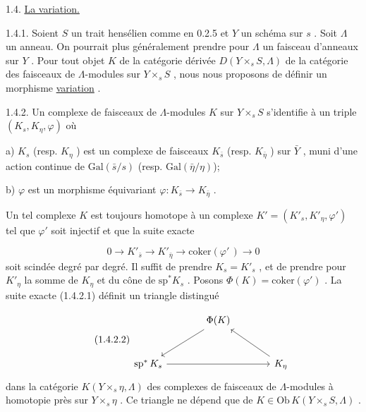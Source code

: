 1.4. \underline{La variation.}

1.4.1. Soient $S$ un trait hensélien comme en 0.2.5 et $Y$ un schéma sur $s$ . Soit $\Lambda$ un anneau. On pourrait plus généralement prendre pour $\Lambda$ un faisceau d'anneaux sur $Y$ . Pour tout objet $K$ de la catégorie dérivée $D(Y \times_s S, \Lambda)$ de la catégorie des faisceaux de $\Lambda$-modules sur $Y \times_s S$ , nous nous proposons de définir un morphisme \underline{variation} .

1.4.2. Un complexe de faisceaux de $\Lambda$-modules $K$ sur $Y \times_s S$ s'identifie à un triple $(K_s, K_\eta , \varphi)$ où

a) $K_s$ (resp. $K_\eta$ ) est un complexe de faisceaux $K_{\bar{s}}$ (resp. $K_{\bar{\eta}}$ ) sur $\bar{Y}$ , muni d'une action continue de $\mathrm{Gal}(\bar{s}/s)$ (resp. $\mathrm{Gal}(\bar{\eta}/\eta)$);

b) $\varphi$ est un morphisme équivariant $\varphi\colon K_{\bar{s}} \to K_{\bar{\eta}}$ .

Un tel complexe $K$ est toujours homotope à un complexe $K' = (K'_s, K'_\eta , \varphi')$ tel que $\varphi'$ soit injectif et que la suite exacte

\begin{equation}\tag{1.4.2.1}
0 \longrightarrow K'_{\bar{s}} \longrightarrow K'_{\bar{\eta}} \longrightarrow \mathrm{coker}(\varphi'\,) \longrightarrow 0
\end{equation}
soit scindée degré par degré. Il suffit de prendre $K_s = K'_s$ , et de prendre pour $K'_\eta$ la somme de $K_\eta$ et du cône de $\mathrm{sp}^* K_s$ . Posons $\Phi(K) = \mathrm{coker}(\varphi')$ . La suite exacte (1.4.2.1) définit un triangle distingué

\begin{equation}\tag{1.4.2.2}
\begin{tikzcd}[column sep=large, row sep=large]
{} & \Phi(K) \arrow[dl] & {} \\
\mathrm{sp}^*\, K_s \arrow[rr] & {} & K_\eta \arrow[ul]
\end{tikzcd}
\end{equation}
dans la catégorie $K(Y \times_s \eta , \Lambda)$ des complexes de faisceaux de $\Lambda$-modules à homotopie près sur $Y \times_s \eta$ . Ce triangle ne dépend que de $K \in \mathrm{Ob}\, K(Y \times_s S, \Lambda)$ .


